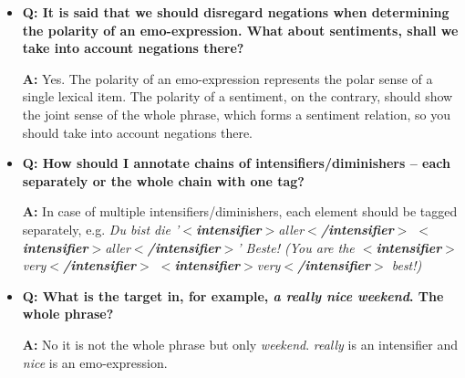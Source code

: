 \documentclass[11pt,a4paper]{article}
\newcommand{\xmltag}[1]{{\textbf{\small$<$#1$>$}}}
\newcommand{\intensifier}[1]{\xmltag{intensifier}#1\xmltag{/intensifier}}
\begin{document}
\begin{itemize}
\item\textbf{Q: It is said that we should disregard negations when
  determining the polarity of an emo-expression.  What about
  sentiments, shall we take into account negations there?}

  \textbf{A:} Yes.  The polarity of an emo-expression represents the
  polar sense of a single lexical item.  The polarity of a sentiment,
  on the contrary, should show the joint sense of the whole phrase,
  which forms a sentiment relation, so you should take into account
  negations there.

\item\textbf{Q: How should I annotate chains of
  intensifiers/diminishers -- each separately or the whole chain with
  one tag?}

  \textbf{A:} In case of multiple intensifiers/diminishers, each
  element should be tagged separately, e.g. \textit{Du bist die
    '\intensifier{aller} \intensifier{aller}' Beste! (You are the
    \intensifier{very} \intensifier{very} best!)}

\item\textbf{Q: What is the target in, for example, \textit{a really nice weekend}. 
	The whole phrase?}

  \textbf{A:} No it is not the whole phrase but only \textit{weekend}. \textit{really} 
	is an intensifier and \textit{nice} is an emo-expression.


\end{itemize}
\end{document}
